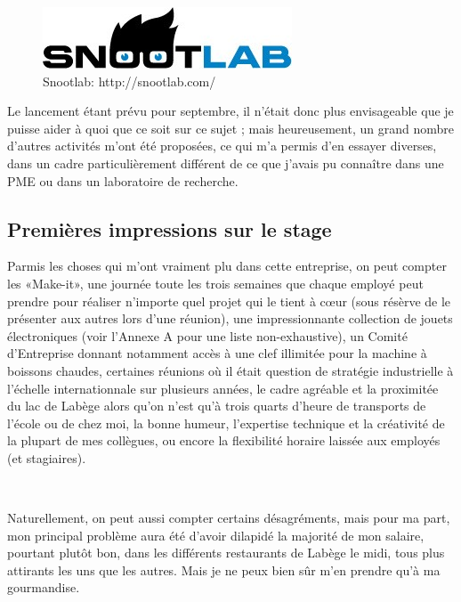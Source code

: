 \documentclass{article}
\begin{document}
\begin{figure}[h!]
    \centering\includegraphics[width=\linewidth/2]{img/snoot.jpg}
    \caption{Snootlab: http://snootlab.com/}
\end{figure}

Le lancement étant prévu pour septembre, il n’était donc plus envisageable que je puisse aider à quoi que ce soit sur ce sujet ; mais heureusement, un grand nombre d’autres activités m’ont été proposées, ce qui m’a permis d’en essayer diverses, dans un cadre particulièrement différent de ce que j’avais pu connaître dans une PME ou dans un laboratoire de recherche.

\subsection{Premières impressions sur le stage}

Parmis les choses qui m’ont vraiment plu dans cette entreprise, on peut compter
les «Make-it», une journée toute les trois semaines que chaque employé peut prendre pour réaliser n’importe quel projet qui le tient à cœur (sous résèrve de le présenter aux autres lors d’une réunion),
une impressionnante collection de jouets électroniques (voir l’Annexe A pour une liste non-exhaustive),
un Comité d’Entreprise donnant notamment accès à une clef illimitée pour la machine à boissons chaudes,
certaines réunions où il était question de stratégie industrielle à l’échelle internationnale sur plusieurs années,
le cadre agréable et la proximitée du lac de Labège alors qu’on n’est qu’à trois quarts d’heure de transports de l’école ou de chez moi,
la bonne humeur, l’expertise technique et la créativité de la plupart de mes collègues,
ou encore la flexibilité horaire laissée aux employés (et stagiaires).

~

Naturellement, on peut aussi compter certains désagréments, mais pour ma part, mon principal problème aura été d’avoir dilapidé la majorité de mon salaire, pourtant plutôt bon, dans les différents restaurants de Labège le midi, tous plus attirants les uns que les autres. Mais je ne peux bien sûr m’en prendre qu’à ma gourmandise.
\end{document}
